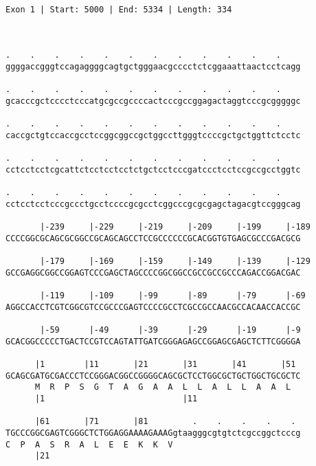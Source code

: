 \documentclass{article}
\begin{document}
 \begin{Verbatim}
 
Exon 1 | Start: 5000 | End: 5334 | Length: 334



.    .    .    .    .    .    .    .    .    .    .    .    
ggggaccgggtccagaggggcagtgctgggaacgcccctctcggaaattaactcctcagg
                                                            
.    .    .    .    .    .    .    .    .    .    .    .    
gcacccgctcccctcccatgcgccgccccactcccgccggagactaggtcccgcgggggc
                                                            
.    .    .    .    .    .    .    .    .    .    .    .    
caccgctgtccaccgcctccggcggccgctggccttgggtccccgctgctggttctcctc
                                                            
.    .    .    .    .    .    .    .    .    .    .    .    
cctcctcctcgcattctcctcctcctctgctcctcccgatccctcctccgccgcctggtc
                                                            
.    .    .    .    .    .    .    .    .    .    .    .    
cctcctcctcccgccctgcctccccgcgcctcggcccgcgcgagctagacgtccgggcag
                                                            
       |-239     |-229     |-219     |-209     |-199     |-189
CCCCGGCGCAGCGCGGCCGCAGCAGCCTCCGCCCCCCGCACGGTGTGAGCGCCCGACGCG
                                                            
       |-179     |-169     |-159     |-149     |-139     |-129
GCCGAGGCGGCCGGAGTCCCGAGCTAGCCCCGGCGGCCGCCGCCGCCCAGACCGGACGAC
                                                            
       |-119     |-109     |-99      |-89      |-79      |-69
AGGCCACCTCGTCGGCGTCCGCCCGAGTCCCCGCCTCGCCGCCAACGCCACAACCACCGC
                                                            
       |-59      |-49      |-39      |-29      |-19      |-9
GCACGGCCCCCTGACTCCGTCCAGTATTGATCGGGAGAGCCGGAGCGAGCTCTTCGGGGA
                                                            
      |1        |11       |21       |31       |41       |51 
GCAGCGATGCGACCCTCCGGGACGGCCGGGGCAGCGCTCCTGGCGCTGCTGGCTGCGCTC
      M  R  P  S  G  T  A  G  A  A  L  L  A  L  L  A  A  L  
      |1                            |11                     
  
      |61       |71       |81         .    .    .    .    . 
TGCCCGGCGAGTCGGGCTCTGGAGGAAAAGAAAGgtaagggcgtgtctcgccggctcccg
C  P  A  S  R  A  L  E  E  K  K  V                          
      |21                                                   
  

\end{Verbatim}
\end{document}
